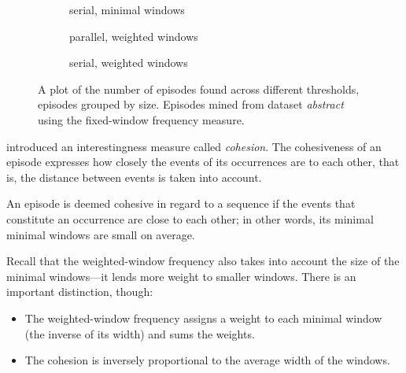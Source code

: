 \begin{figure}
\begin{subfigure}[b]{0.5\textwidth}
\begin{tikzpicture}[scale=0.65]
\end{tikzpicture}
\caption{serial, minimal windows}
\label{fig:episode-frequencies-by-size-parallel-wwi}
\end{subfigure}
\begin{subfigure}[b]{0.5\textwidth}
\centering
{}
\caption{parallel, weighted windows}
\label{fig:episode-frequencies-by-size-serial-wwi}
\end{subfigure}
\begin{subfigure}[b]{0.5\textwidth}
\centering
{}
\caption{serial, weighted windows}
\label{fig:episode-frequencies-by-size-parallel-fwi}
\end{subfigure}
\caption{A plot of the number of episodes found across different thresholds, episodes grouped by size. Episodes mined from dataset \emph{abstract} using the fixed-window frequency measure.}
\label{fig:episode-frequencies-by-size}
\end{figure}
\citep{cule2016efficient} introduced an interestingness measure called \emph{cohesion}. The cohesiveness of an episode expresses how closely the events of its occurrences are to each other, that is, the distance between events is taken into account.

An episode is deemed cohesive in regard to a sequence if the events that constitute an occurrence are close to each other; in other words, its minimal minimal windows are small on average.

Recall that the weighted-window frequency also takes into account the size of the minimal windows---it lends more weight to smaller windows. There is an important distinction, though:
\begin{itemize}
\item The weighted-window frequency assigns a weight to each minimal window (the inverse of its width) and sums the weights.
\item The cohesion is inversely proportional to the average width of the windows.
\end{itemize}

